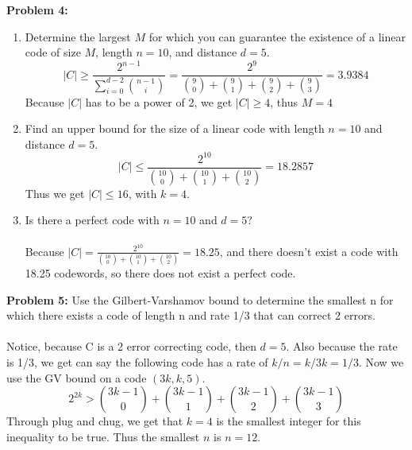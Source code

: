 \documentclass[11pt]{article}
\newenvironment{problem}[1]{\textbf{Problem #1: }}{\newpage}
\begin{document}
	\begin{problem}{4}
		\begin{enumerate}[label = (\alph*)]
			\item Determine the largest $M$ for which you can guarantee the existence of a
			linear code of size $M$, length $n = 10$, and distance $d = 5$.
			\[|C| \geq \frac{2^{n-1}}{\sum_{i = 0}^{d - 2} \binom{n-1}{i}} = \frac{2^9}{\binom{9}{0} + \binom{9}{1} + \binom{9}{2} + \binom{9}{3}} = 3.9384\]
			Because $|C|$ has to be a power of 2, we get $|C| \geq 4$, thus $M = 4$
			\item Find an upper bound for the size of a linear code with length $n = 10$ and
			distance $d = 5$.
			\[|C| \leq \frac{2^{10}}{\binom{10}{0} + \binom{10}{1} + \binom{10}{2}} = 18.2857\]
			Thus we get $|C| \leq 16$, with $k = 4$.
			\item Is there a perfect code with $n = 10$ and $d = 5$?
			\\ \\
			Because $|C| = \frac{2^{10}}{\binom{10}{0} + \binom{10}{1} + \binom{10}{2}} = 18.25$, and there doesn't exist a code with 18.25 codewords, so there does not exist a perfect code. 
		\end{enumerate}
	\end{problem}

	\begin{problem}{5}
		Use the Gilbert-Varshamov bound to determine the smallest n for
		which there exists a code of length n and rate 1/3 that can correct 2 errors.
		\\ \\
		Notice, because C is a 2 error correcting code, then $d = 5$.  Also because the rate is 1/3, we get can say the following code has a rate of $k / n = k / 3k = 1/3$.  Now we use the GV bound on a code $(3k, k, 5)$.
		\[2^{2k} > \binom{3k - 1}{0} + \binom{3k - 1}{1} + \binom{3k - 1}{2} + \binom{3k - 1}{3}\]
		Through plug and chug, we get that $k = 4$ is the smallest integer for this inequality to be true.  Thus the smallest $n$ is $n = 12$.
	\end{problem}
\end{document}
